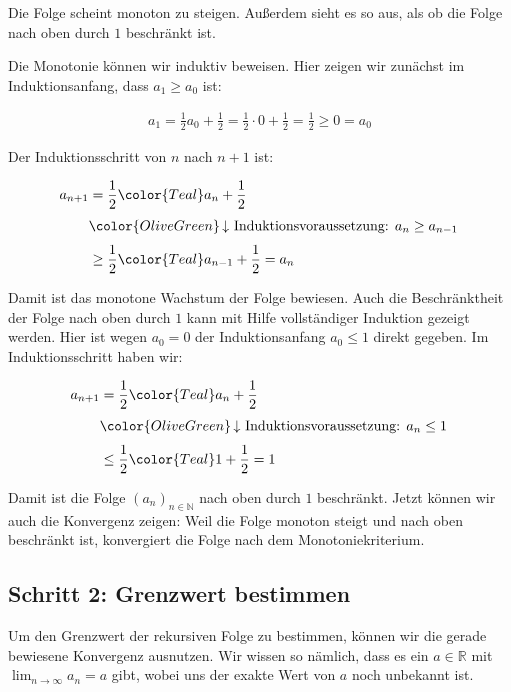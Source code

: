 \documentclass[fontsize=9pt,
               parskip=half-,
               DIV=14,
               listof=chapterentry,
               tocflat]{scrbook}
\begin{document}
Die Folge scheint monoton zu steigen. Außerdem sieht es so aus, als ob die Folge nach oben durch $1$ beschränkt ist.

Die Monotonie können wir induktiv beweisen. Hier zeigen wir zunächst im Induktionsanfang, dass $a_{1}\geq a_{0}$ ist:

\begin{align*}
a_{1}={\frac {1}{2}}a_{0}+{\frac {1}{2}}={\frac {1}{2}}\cdot 0+{\frac {1}{2}}={\frac {1}{2}}\geq 0=a_{0}
\end{align*}

Der Induktionsschritt von $n$ nach $n+1$ ist:

\begin{align*}
a_{n+1}&={\frac {1}{2}}{\color {Teal}a_{n}}+{\frac {1}{2}}\\[0.3em]&{\color {OliveGreen}\left\downarrow \ {\text{Induktionsvoraussetzung: }}a_{n}\geq a_{n-1}\right.}\\[0.3em]&\geq {\frac {1}{2}}{\color {Teal}a_{n-1}}+{\frac {1}{2}}=a_{n}
\end{align*}

Damit ist das monotone Wachstum der Folge bewiesen. Auch die Beschränktheit der Folge nach oben durch $1$ kann mit Hilfe vollständiger Induktion gezeigt werden. Hier ist wegen $a_{0}=0$ der Induktionsanfang $a_{0}\leq 1$ direkt gegeben. Im Induktionsschritt haben wir:

\begin{align*}
a_{n+1}&={\frac {1}{2}}{\color {Teal}a_{n}}+{\frac {1}{2}}\\[0.3em]&{\color {OliveGreen}\left\downarrow \ {\text{Induktionsvoraussetzung: }}a_{n}\leq 1\right.}\\[0.3em]&\leq {\frac {1}{2}}{\color {Teal}1}+{\frac {1}{2}}=1
\end{align*}

Damit ist die Folge $(a_{n})_{n\in \mathbb {N} }$ nach oben durch $1$ beschränkt. Jetzt können wir auch die Konvergenz zeigen: Weil die Folge monoton steigt und nach oben beschränkt ist, konvergiert die Folge nach dem Monotoniekriterium.

\subsection{Schritt 2: Grenzwert bestimmen}

Um den Grenzwert der rekursiven Folge zu bestimmen, können wir die gerade bewiesene Konvergenz ausnutzen. Wir wissen so nämlich, dass es ein $a\in \mathbb {R} $ mit $\lim _{n\to \infty }a_{n}=a$ gibt, wobei uns der exakte Wert von $a$ noch unbekannt ist.
\end{document}
